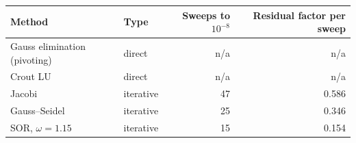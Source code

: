 \begin{tabular}{@{}l l r r@{}}
\toprule
Method & Type & Sweeps to $10^{-8}$ & Residual factor per sweep \\
\midrule
Gauss elimination (pivoting) & direct & n/a & n/a \\
Crout LU & direct & n/a & n/a \\
Jacobi & iterative & 47 & 0.586 \\
Gauss--Seidel & iterative & 25 & 0.346 \\
SOR, $\omega=1.15$ & iterative & 15 & 0.154 \\
\bottomrule
\end{tabular}
